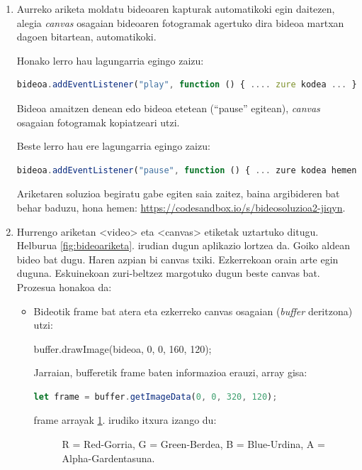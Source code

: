 \begin{enumerate}
\item Aurreko ariketa moldatu bideoaren kapturak automatikoki egin daitezen, alegia \textit{canvas} osagaian bideoaren fotogramak agertuko dira bideoa martxan dagoen bitartean, automatikoki.

Honako lerro hau lagungarria egingo zaizu:

\begin{lstlisting}[language=JavaScript,numbers=none]
bideoa.addEventListener("play", function () { .... zure kodea ... }
\end{lstlisting}

Bideoa amaitzen denean edo bideoa etetean (``pause'' egitean), \textit{canvas} osagaian fotogramak kopiatzeari utzi.

Beste lerro hau ere lagungarria egingo zaizu:

\begin{lstlisting}[language=JavaScript,numbers=none]
bideoa.addEventListener("pause", function () { ... zure kodea hemen ...}
\end{lstlisting}

Ariketaren soluzioa begiratu gabe egiten saia zaitez, baina argibideren bat behar baduzu, hona hemen: \href{https://codesandbox.io/s/bideosoluzioa2-jiqyn}{https://codesandbox.io/s/bideosoluzioa2-jiqyn}.


\item Hurrengo ariketan <video> eta <canvas> etiketak uztartuko ditugu. Helburua \ref{fig:bideoariketa}. irudian dugun aplikazio lortzea da. Goiko aldean bideo bat dugu. Haren azpian bi canvas txiki. Ezkerrekoan orain arte egin duguna.
Eskuinekoan zuri-beltzez margotuko dugun beste canvas bat. Prozesua honakoa da:

\begin{itemize}
    \item Bideotik frame bat atera eta ezkerreko canvas osagaian (\textit{buffer} deritzona) utzi:

buffer.drawImage(bideoa, 0, 0, 160, 120);

Jarraian, bufferetik frame baten informazioa erauzi, array gisa:

\begin{lstlisting}[language=JavaScript,numbers=none]
let frame = buffer.getImageData(0, 0, 320, 120);
\end{lstlisting}

frame arrayak \ref{fig:bideoariketa2}. irudiko itxura izango du:

\begin{figure}[ht]
\centering
{}
\caption{R = Red-Gorria, G = Green-Berdea, B = Blue-Urdina, A = Alpha-Gardentasuna.}
\label{fig:bideoariketa2}
\end{figure}
     


\end{itemize}
\end{enumerate}
